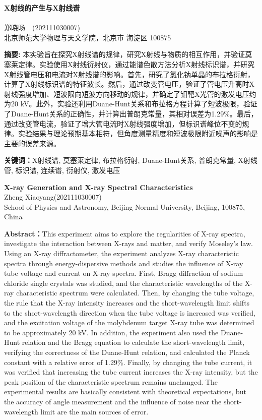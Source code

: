 \documentclass{whureport}
\newcommand{\name}{郑晓旸}
\newcommand{\stuid}{202111030007}
\newcommand{\Name}{Zheng Xiaoyang}
\newcommand{\newtitle}{X射线的产生与X射线谱}
\begin{document}
\pagestyle{maincontent} 


\begin{center}
 \textbf{\newtitle}\\
~\\
 \kaishu \name \ \ (\stuid)\\
 \kaishu 北京师范大学物理与天文学院，北京市 海淀区 100875\\
\end{center}
\textbf{摘\quad 要:}
本实验旨在探究X射线谱的规律，研究X射线与物质的相互作用，并验证莫塞莱定律。实验使用X射线衍射仪，通过能谱色散方法分析X射线标识谱，并研究X射线管电压和电流对X射线谱的影响。首先，研究了氯化钠单晶的布拉格衍射，计算了X射线标识谱的特征波长。然后，通过改变管电压，验证了管电压升高时X射线强度增加、短波限向短波方向移动的规律，并确定了钼靶X光管的激发电压约为20 kV。此外，实验还利用Duane-Hunt关系和布拉格方程计算了短波极限，验证了Duane-Hunt关系的正确性，并计算出普朗克常量，其相对误差为1.29\%。最后，通过改变管电流，验证了增大管电流时X射线强度增加，但标识谱峰位不变的规律。实验结果与理论预期基本相符，但角度测量精度和短波极限附近噪声的影响是主要的误差来源。

\textbf{关键词：}X射线谱, 莫塞莱定律, 布拉格衍射, Duane-Hunt关系, 普朗克常量, X射线管, 标识谱, 连续谱, 衍射仪, 激发电压
~\\
\begin{center}
	 \textbf{X-ray Generation and X-ray Spectral Characteristics}\\
	 \Name\quad (\stuid)\\
	 School of Physics and Astronomy, Beijing Normal University, Beijing, 100875, China
\end{center}

\textbf{Abstract：}This experiment aims to explore the regularities of X-ray spectra, investigate the interaction between X-rays and matter, and verify Moseley's law. Using an X-ray diffractometer, the experiment analyzes X-ray characteristic spectra through energy-dispersive methods and studies the influence of X-ray tube voltage and current on X-ray spectra. First, Bragg diffraction of sodium chloride single crystals was studied, and the characteristic wavelengths of the X-ray characteristic spectrum were calculated. Then, by changing the tube voltage, the rule that the X-ray intensity increases and the short-wavelength limit shifts to the short-wavelength direction when the tube voltage is increased was verified, and the excitation voltage of the molybdenum target X-ray tube was determined to be approximately 20 kV. In addition, the experiment also used the Duane-Hunt relation and the Bragg equation to calculate the short-wavelength limit, verifying the correctness of the Duane-Hunt relation, and calculated the Planck constant with a relative error of 1.29\%. Finally, by changing the tube current, it was verified that increasing the tube current increases the X-ray intensity, but the peak position of the characteristic spectrum remains unchanged. The experimental results are basically consistent with theoretical expectations, but the accuracy of angle measurement and the influence of noise near the short-wavelength limit are the main sources of error.
\end{document}
